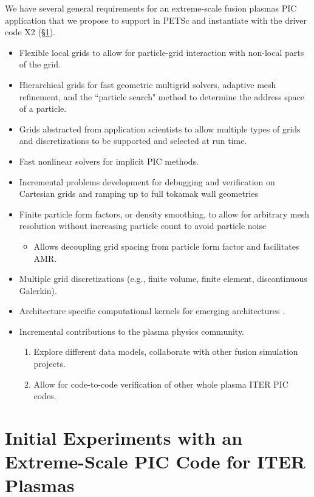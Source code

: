 \documentclass[review]{siamart}
\begin{document}
We have several general requirements for an extreme-scale fusion plasmas PIC application that we propose to support in PETSc and instantiate with the driver code X2 (\S\ref{sec:x2}).
\begin{itemize}
\item Flexible local grids to allow for particle-grid interaction with non-local parts of the grid.
\item Hierarchical grids for fast geometric multigrid solvers, adaptive mesh refinement, and the ``particle search" method to determine the address space of a particle.
\item Grids abstracted from application scientists to allow multiple types of grids and discretizations to be supported and selected at run time.
\item Fast nonlinear solvers for implicit PIC methods.
\item Incremental problems development for debugging and verification on Cartesian grids and ramping up to full tokamak wall geometries 
\item Finite particle form factors, or density smoothing, to allow for arbitrary mesh resolution without increasing particle count to avoid particle noise
\begin{itemize}
\item Allows decoupling grid spacing from particle form factor and facilitates AMR.
\end{itemize}
\item Multiple grid discretizations (e.g., finite volume, finite element, discontinuous Galerkin).
\item Architecture specific computational kernels for emerging architectures \cite{KnepleyBrownMcInnesSmithRuppAdams2015}.
\item Incremental contributions to the plasma physics community.
\begin{enumerate}
\item Explore different data models, collaborate with other fusion simulation projects.
\item Allow for code-to-code verification of other whole plasma ITER PIC codes.
\end{enumerate}
\end{itemize}

\section{Initial Experiments with an Extreme-Scale PIC Code for ITER Plasmas}
\label{sec:x2}
\end{document}
